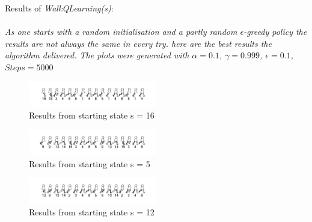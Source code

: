 \documentclass[conference]{IEEEtran}
\begin{document}
\begin{itemize}
\newpage
Results of \textit{WalkQLearning(s)}: 
\\
\\
\textit{As one starts with a random initialisation and a partly random $\epsilon$-greedy policy the results are not always the same in every try. here are the best results the algorithm delivered. The plots were generated with $\alpha=0.1$, $\gamma=0.999$, $\epsilon=0.1$, $Steps=5000$}

\begin{figure}[h!]
  	\centering
    \includegraphics[width=0.5\textwidth]{img/3walkshow16.png}
    \caption{Results from starting state s = 16}
    \label{fig:3walkshow16}
\end{figure}

\begin{figure}[h!]
  	\centering
    \includegraphics[width=0.5\textwidth]{img/3walkshow5.png}
    \caption{Results from starting state s = 5}
    \label{fig:3walkshow5}
\end{figure}

\begin{figure}[h!]
  	\centering
    \includegraphics[width=0.5\textwidth]{img/3walkshow12.png}
    \caption{Results from starting state s = 12}
    \label{fig:3walkshow12}
\end{figure}


\end{itemize}
\end{document}
